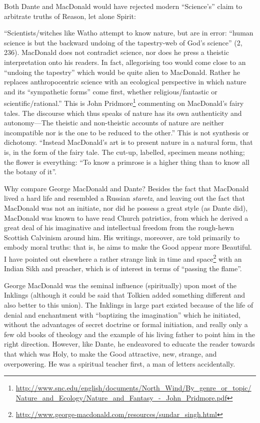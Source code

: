 Both Dante and MacDonald would have rejected modern ``Science's'' claim to arbitrate truths of Reason, let alone Spirit:

\begin{quotex}
``Scientists/witches like Watho attempt to know nature, but are in error: ``human science is but the backward undoing of the tapestry-web of God's science'' (2, 236). MacDonald does not contradict science, nor does he press a theistic interpretation onto his readers. In fact, allegorising too would come close to an ``undoing the tapestry'' which would be quite alien to MacDonald. Rather he replaces anthropocentric science with an ecological perspective in which nature and its ``sympathetic forms'' come first, whether religious/fantastic or scientific/rational.'' This is John Pridmore\footnote{\url{http://www.snc.edu/english/documents/North_Wind/By_genre_or_topic/Nature_and_Ecology/Nature_and_Fantasy_-_John_Pridmore.pdf}} commenting on MacDonald's fairy tales. The discourse which thus speaks of nature has its own authenticity and autonomy---The theistic and non-theistic accounts of nature are neither incompatible nor is the one to be reduced to the other.'' This is not synthesis or dichotomy. ``Instead MacDonald's art is to present nature in a natural form, that is, in the form of the fairy tale. The cut-up, labelled, specimen means nothing; the flower is everything: ``To know a primrose is a higher thing than to know all the botany of it''.
\end{quotex}

Why compare George MacDonald and Dante? Besides the fact that MacDonald lived a hard life and resembled a Russian \emph{staretz}, and leaving out the fact that MacDonald was not an initiate, nor did he possess a great style (as Dante did), MacDonald was known to have read Church patristics, from which he derived a great deal of his imaginative and intellectual freedom from the rough-hewn Scottish Calvinism around him. His writings, moreover, are told primarily to embody moral truths: that is, he aims to make the Good appear more Beautiful. I have pointed out elsewhere a rather strange link in time and space\footnote{\url{http://www.george-macdonald.com/resources/sundar\_singh.html}} with an Indian Sikh and preacher, which is of interest in terms of ``passing the flame''.

George MacDonald was the seminal influence (spiritually) upon most of the Inklings (although it could be said that Tolkien added something different and also better to this union). The Inklings in large part existed because of the life of denial and enchantment with ``baptizing the imagination'' which he initiated, without the advantages of secret doctrine or formal initiation, and really only a few old books of theology and the example of his living father to point him in the right direction. However, like Dante, he endeavored to educate the reader towards that which was Holy, to make the Good attractive, new, strange, and overpowering. He was a spiritual teacher first, a man of letters accidentally.

